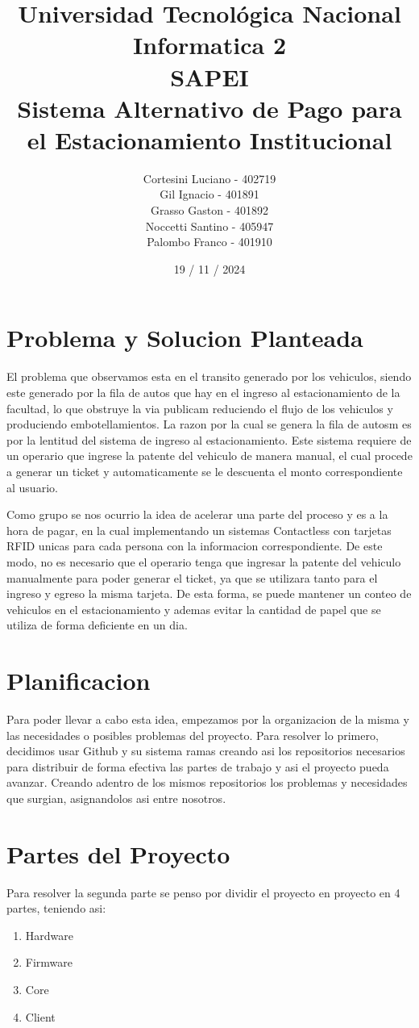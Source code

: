 \documentclass[a4paper, 12pt]{report}
\title{%
  \fontsize{25}{0}\selectfont Universidad Tecnológica Nacional \\
  \fontsize{22}{30}\selectfont Informatica 2 \\
  \fontsize{18}{25}\selectfont SAPEI\\
  \fontsize{16}{20}\selectfont Sistema Alternativo de Pago para el Estacionamiento Institucional\\
}
\author{
Cortesini Luciano - 402719\\
Gil Ignacio - 401891\\
Grasso Gaston - 401892\\
Noccetti Santino - 405947 \\
Palombo Franco - 401910
}
\date{19 / 11 / 2024}
\begin{document}
\maketitle
\section{Problema y Solucion Planteada}
    El problema que observamos esta en el transito generado por los vehiculos, siendo este generado por la fila de
    autos que hay en el ingreso al estacionamiento de la facultad, lo que obstruye la via publicam reduciendo el flujo
    de los vehiculos y produciendo embotellamientos. La razon por la cual se genera la fila de autosm es por la
    lentitud del sistema de ingreso al estacionamiento. Este sistema requiere de un operario que ingrese la patente
    del vehiculo de manera manual, el cual procede a generar un ticket y automaticamente se le descuenta el monto
    correspondiente al usuario.


    Como grupo se nos ocurrio la idea de acelerar una parte del proceso y es a la hora de pagar, en la cual
    implementando un sistemas Contactless con tarjetas RFID unicas para cada persona con la informacion
    correspondiente. De este modo, no es necesario que el operario tenga que ingresar la patente del vehiculo
    manualmente para poder generar el ticket, ya que se utilizara tanto para el ingreso y egreso la misma tarjeta. De
    esta forma, se puede mantener un conteo de vehiculos en el estacionamiento y ademas evitar la cantidad de papel
    que se utiliza de forma deficiente en un dia.

\section{Planificacion}
    Para poder llevar a cabo esta idea, empezamos por la organizacion de la misma y las necesidades o posibles
    problemas del proyecto. Para resolver lo primero, decidimos usar Github y su sistema ramas creando asi los
    repositorios necesarios para distribuir de forma efectiva las partes de trabajo y asi el proyecto pueda avanzar.
    Creando adentro de los mismos repositorios los problemas y necesidades que surgian, asignandolos asi entre nosotros.

\section{Partes del Proyecto}
    Para resolver la segunda parte se penso por dividir el proyecto en proyecto en 4 partes, teniendo asi:
    \begin{enumerate}
        \item Hardware
        \item Firmware
        \item Core
        \item Client
    \end{enumerate}
    \newpage
\end{document}
